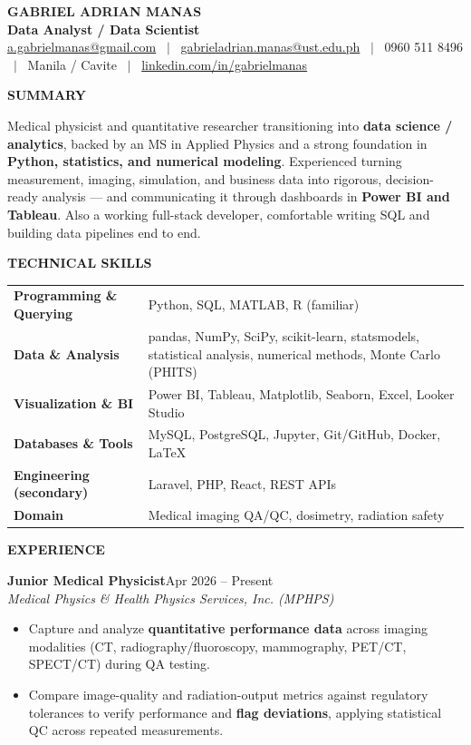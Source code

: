 \documentclass[10pt,letterpaper]{article}
\newcommand{\rsec}[1]{%
  \vspace{6pt}%
  {\normalsize\bfseries\color{accent}\MakeUppercase{#1}}\par
  \vspace{1pt}{\color{accent}\hrule height 1pt}\vspace{4pt}%
}
\newcommand{\job}[3]{%
  \vspace{4pt}%
  {\bfseries #1}\hfill{\small\color{muted}#2}\\
  {\itshape #3}\par\vspace{1pt}%
}
\newenvironment{bullets}
  {\begin{itemize}[leftmargin=1.25em,itemsep=1pt,topsep=1pt,parsep=0pt,
     label=\textcolor{accent}{\footnotesize$\bullet$}]}
  {\end{itemize}}
\begin{document}
\begin{center}
  {\fontsize{22}{24}\selectfont\bfseries GABRIEL ADRIAN MANAS}\\[2pt]
  {\large\color{accent}\bfseries Data Analyst / Data Scientist}\\[4pt]
  {\small
    \href{mailto:a.gabrielmanas@gmail.com}{a.gabrielmanas@gmail.com} \ $\vert$ \
    \href{mailto:gabrieladrian.manas@ust.edu.ph}{gabrieladrian.manas@ust.edu.ph} \ $\vert$ \
    0960 511 8496 \ $\vert$ \ Manila / Cavite \ $\vert$ \
    \href{https://linkedin.com/in/gabrielmanas}{linkedin.com/in/gabrielmanas}
  }
\end{center}

\rsec{Summary}
Medical physicist and quantitative researcher transitioning into \textbf{data science / analytics},
backed by an MS in Applied Physics and a strong foundation in \textbf{Python, statistics, and numerical
modeling}. Experienced turning measurement, imaging, simulation, and business data into rigorous,
decision-ready analysis --- and communicating it through dashboards in \textbf{Power BI and Tableau}.
Also a working full-stack developer, comfortable writing SQL and building data pipelines end to end.

\rsec{Technical Skills}
\begin{tabularx}{\linewidth}{@{}>{\bfseries}p{1.75in}X@{}}
Programming \& Querying & Python, SQL, MATLAB, R (familiar) \\
Data \& Analysis        & pandas, NumPy, SciPy, scikit-learn, statsmodels, statistical analysis, numerical methods, Monte Carlo (PHITS) \\
Visualization \& BI     & Power BI, Tableau, Matplotlib, Seaborn, Excel, Looker Studio \\
Databases \& Tools      & MySQL, PostgreSQL, Jupyter, Git/GitHub, Docker, \LaTeX{} \\
Engineering (secondary) & Laravel, PHP, React, REST APIs \\
Domain                  & Medical imaging QA/QC, dosimetry, radiation safety \\
\end{tabularx}

\rsec{Experience}

\job{Junior Medical Physicist}{Apr 2026 -- Present}{Medical Physics \& Health Physics Services, Inc. (MPHPS)}
\begin{bullets}
  \item Capture and analyze \textbf{quantitative performance data} across imaging modalities (CT, radiography/fluoroscopy, mammography, PET/CT, SPECT/CT) during QA testing.
  \item Compare image-quality and radiation-output metrics against regulatory tolerances to verify performance and \textbf{flag deviations}, applying statistical QC across repeated measurements.
\end{bullets}
\end{document}
